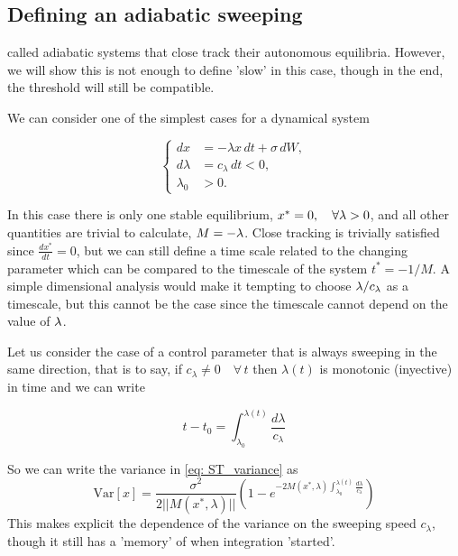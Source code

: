 \subsection{Defining an adiabatic sweeping}

 \cite{Perryman2014a}  called adiabatic  systems that close track their autonomous equilibria.
  However, we will show this is not enough to define 'slow' in this case, though in the end, the threshold will still be compatible. 

We can consider one of the simplest cases for a dynamical system


\begin{equation}
	\begin{cases}
		dx &=-\lambda x \,dt + \sigma\, dW,\\
		d \lambda &= c_\lambda\, dt <0,\\
		\lambda_0 &> 0.
	\end{cases}
\label{eq: simplecase}
\end{equation}

In this case there is only one stable equilibrium, $x^*=0, \quad \forall \lambda >0 $, and all other quantities are trivial to calculate, $M=-\lambda$.
Close tracking is trivially satisfied since $\frac{dx^*}{dt}=0$, but we can still define a time scale related to the changing parameter  which can be compared to the timescale of the system $t^*=-1/M$.
A simple dimensional analysis would make it tempting to choose $\lambda/c_\lambda$ as a timescale, but this cannot be the case since the timescale cannot depend on the value of $\lambda$.

Let us consider the case of a control parameter that is always sweeping in the same direction, that is to say, if $c_\lambda\neq 0 \quad \forall \, t$ then  $\lambda(t)$ is monotonic (inyective) in time and we can write 

\begin{equation}
	t-t_0=\int_{\lambda_0}^{\lambda(t)} \frac{d\lambda}{c_\lambda}
\end{equation}

So we can write the variance in \cref{eq: ST_variance} as 
\begin{equation}
	\mathrm{Var}[x]=\frac{\sigma^2}{2 ||M(x^*,\lambda)||}\left( 1-e^{-2M(x^*,\lambda)	\int_{\lambda_0}^{\lambda(t)} \frac{d\lambda}{c_\lambda}}\right) 
	\label{eq: ST_variance_swip}
\end{equation}
This makes explicit the dependence of the variance on the sweeping speed $c_\lambda$, though it still has a 'memory' of when integration 'started'. 

